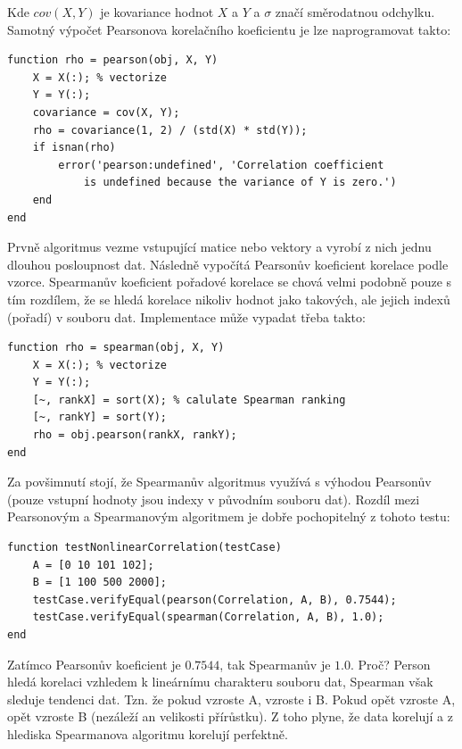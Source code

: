 Kde $cov(X,Y)$ je kovariance hodnot $X$ a $Y$ a $\sigma$ značí směrodatnou odchylku. Samotný výpočet Pearsonova korelačního koeficientu je lze naprogramovat takto:

\begin{verbatim}
function rho = pearson(obj, X, Y)
    X = X(:); % vectorize
    Y = Y(:);
    covariance = cov(X, Y);
    rho = covariance(1, 2) / (std(X) * std(Y));
    if isnan(rho)
        error('pearson:undefined', 'Correlation coefficient
            is undefined because the variance of Y is zero.')
    end
end
\end{verbatim}

Prvně algoritmus vezme vstupující matice nebo vektory a vyrobí z nich jednu dlouhou posloupnost dat. Následně vypočítá Pearsonův koeficient korelace podle vzorce. Spearmanův koeficient pořadové korelace se chová velmi podobně pouze s tím rozdílem, že se hledá korelace nikoliv hodnot jako takových, ale jejich indexů (pořadí) v souboru dat. Implementace může vypadat třeba takto:

\begin{verbatim}
function rho = spearman(obj, X, Y)
    X = X(:); % vectorize
    Y = Y(:);
    [~, rankX] = sort(X); % calulate Spearman ranking
    [~, rankY] = sort(Y);
    rho = obj.pearson(rankX, rankY);
end
\end{verbatim}

Za povšimnutí stojí, že Spearmanův algoritmus využívá s výhodou Pearsonův (pouze vstupní hodnoty jsou indexy v původním souboru dat). Rozdíl mezi Pearsonovým a Spearmanovým algoritmem je dobře pochopitelný z tohoto testu:

\begin{verbatim}
function testNonlinearCorrelation(testCase)
    A = [0 10 101 102];
    B = [1 100 500 2000];
    testCase.verifyEqual(pearson(Correlation, A, B), 0.7544);
    testCase.verifyEqual(spearman(Correlation, A, B), 1.0);
end
\end{verbatim}

Zatímco Pearsonův koeficient je $0.7544$, tak Spearmanův je $1.0$. Proč? Person hledá korelaci vzhledem k lineárnímu charakteru souboru dat, Spearman však sleduje tendenci dat. Tzn. že pokud vzroste A, vzroste i B. Pokud opět vzroste A, opět vzroste B (nezáleží an velikosti přírůstku). Z toho plyne, že data korelují a z hlediska Spearmanova algoritmu korelují perfektně.

